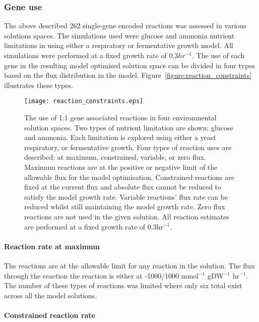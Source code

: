 \subsubsection{Gene use}

The above described 262 single-gene encoded reactions was assessed in various solutions spaces. The simulations used were glucose and ammonia nutrient limitations in using either a respiratory or fermentative growth model. All simulations were performed at a fixed growth rate of 0.3$hr^{-1}$. The use of each gene in the resulting model optimised solution space can be divided in four types based on the flux distribution in the model. Figure~\vref{figure:reaction_constraints} illustrates these types.

\begin{figure}
\centering
\texttt{[image: reaction\_constraints.eps]}
\caption[Gene use in model optimised solution space]{The use of 1:1 gene associated reactions in four environmental solution spaces. Two types of nutrient limitation are shown: glucose and ammonia. Each limitation is explored using either a yeast respiratory, or fermentative growth. Four types of reaction uses are described: at maximum, constrained, variable, or zero flux. Maximum reactions are at the positive or negative limit of the allowable flux for the model optimisation. Constrained reactions are fixed at the current flux and absolute flux cannot be reduced to satisfy the model growth rate. Variable reactions' flux rate can be reduced whilst still maintaining the model growth rate. Zero flux reactions are not used in the given solution. All reaction estimates are performed at a fixed growth rate of 0.3hr$^{-1}$. }
\label{figure:reaction_constraints}
\end{figure}

\paragraph{Reaction rate at maximum}

The reactions are at the allowable limit for any reaction in the solution. The flux through the reaction the reaction is either at -1000/1000 mmol$^{-1}$ gDW$^{-1}$ hr$^{-1}$. The number of these types of reactions was limited where only six total exist across all the model solutions.

\paragraph{Constrained reaction rate}

